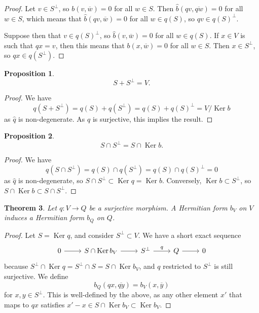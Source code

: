 \documentclass[10pt,a4paper]{article}
\newtheorem{theo}{Theorem}[section]
\newtheorem{prop}[theo]{Proposition}
\newtheorem*{proof}{Proof}
\def\ov#1{\overline{#1}}
\DeclareMathOperator{\Ker}{Ker}
\begin{document}
\begin{proof}
Let $v \in S^\perp$, so $b(v, \ov w) = 0$ for all $w \in S$. Then $\hat b(qv, \ov{qw}) = 0$ for all $w \in S$, which means that $\hat b(qv, \ov w) = 0$ for all $w \in q(S)$, so $qv \in q(S)^\perp$.

Suppose then that $v \in q(S)^\perp$, so $\hat b(v, \ov w) = 0$ for all $w \in q(S)$. If $x \in V$ is such that $qx = v$, then this means that $b(x, \ov w) = 0$ for all $w \in S$. Then $x \in S^\perp$, so $qx \in q(S^\perp)$.
\end{proof}



\begin{prop}
\[
S + S^\perp = V.
\]
\end{prop}

\begin{proof}
We have
\[
q(S + S^\perp)
= q(S) + q(S^\perp)
= q(S) + q(S)^\perp
= V / \Ker b
\]
as $\hat q$ is non-degenerate. As $q$ is surjective, this implies the result.
\end{proof}




\begin{prop}
\[
S \cap S^\perp = S \cap \Ker b.
\]
\end{prop}

\begin{proof}
We have
\[
q(S \cap S^\perp)
= q(S) \cap q(S^\perp)
= q(S) \cap q(S)^\perp
= 0
\]
as $\hat q$ is non-degenerate,
so $S \cap S^\perp \subset \Ker q = \Ker b$. Conversely, $\Ker b \subset S^\perp$, so $S \cap \Ker b \subset S \cap S^\perp$.
\end{proof}


\begin{theo}
Let $q : V \to Q$ be a surjective morphism. A Hermitian form $b_V$ on $V$ induces a Hermitian form $b_Q$ on $Q$.
\end{theo}

\begin{proof}
Let $S = \Ker q$, and consider $S^\perp \subset V$. We have a short exact sequence
\[
\begin{tikzcd}
0 \ar[r] &
S \cap \Ker b_V \ar[r] &
S^\perp \ar[r,"q"] &
Q \ar[r] &
0
\end{tikzcd}
\]
because $S^\perp \cap \Ker q = S^\perp \cap S = S \cap \Ker b_V$, and $q$ restricted to $S^\perp$ is still surjective. We define
\[
b_Q(qx, \ov{qy})
= b_V(x, \ov y)
\]
for $x, y \in S^\perp$. This is well-defined by the above, as any other element $x'$ that maps to $qx$ satisfies $x' - x \in S \cap \Ker b_V \subset \Ker b_V$.
\end{proof}
\end{document}
